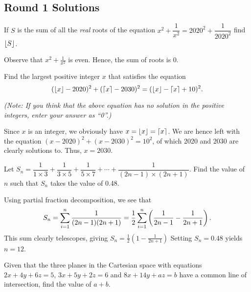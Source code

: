 \subsection{Round 1 Solutions}\label{S::2020-O-1}



\begin{question}[0]\label{A::2020-O-1-1}
    If $S$ is the sum of all the \textit{real} roots of the equation $x^2 + \dfrac{1}{x^2} = 2020^2 + \dfrac{1}{2020^2}$ find $\left\lfloor S \right\rfloor$.
\end{question}

Observe that $x^2 + \frac1{x^2}$ is even. Hence, the sum of roots is 0.

\begin{question}[2030]\label{A::2020-O-1-2}
    Find the largest positive integer $x$ that satisfies the equation \[(\left\lfloor x \right\rfloor - 2020)^2 + (\left\lceil x \right\rceil - 2030)^2 = (\left\lfloor x \right\rfloor - \left\lceil x \right\rceil + 10)^2.\]

    \noindent\textit{(Note: If you think that the above equation has no solution in the positive integers, enter your answer as ``0''.)}
\end{question}

Since $x$ is an integer, we obviously have $x = \left\lfloor x \right\rfloor = \left\lceil x \right\rceil$. We are hence left with the equation $(x - 2020)^2 + (x - 2030)^2 = 10^2$, of which 2020 and 2030 are clearly solutions to. Thus, $x = 2030$.

\begin{question}[12]\label{A::2020-O-1-3}
    Let $S_n = \dfrac1{1 \times 3} + \dfrac{1}{3 \times 5} + \dfrac1{5 \times 7} + \cdots + \dfrac{1}{(2n-1) \times (2n+1)}$. Find the value of $n$ such that $S_n$ takes the value of 0.48.
\end{question}

Using partial fraction decomposition, we see that \[S_n = \sum_{i = 1}^{n} \frac{1}{(2n-1)(2n+1)} = \frac12 \sum_{i = 1}^n \left( \frac{1}{2n-1} - \frac{1}{2n+1} \right).\] This sum clearly telescopes, giving $S_n = \frac12 (1 - \frac{1}{2n + 1})$ Setting $S_n = 0.48$ yields $n = 12$.

\begin{question}[27]\label{A::2020-O-1-4}
    Given that the three planes in the Cartesian space with equations $2x + 4y + 6z = 5$, $3x + 5y + 2z = 6$ and $8x + 14y + az = b$ have a common line of intersection, find the value of $a + b$.
\end{question}

